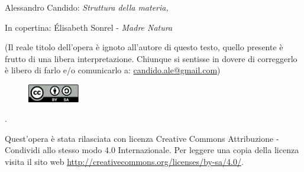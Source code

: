 \cleardoublepage


\begin{titlepage}
	\makeatletter
	\centering
	\vspace*{1.5cm}
	{\huge\bfseries \@title \par}
	\vspace{2cm}
	{\Large\itshape \@author \par}
	\makeatother
	
	\vfill
\end{titlepage}


\thispagestyle{empty}

\hfill

\vfill


\noindent Alessandro Candido: \textit{Struttura della materia,}
\textcopyleft\ \DTMMonthname{\the\month} \the\year
\newline

\noindent In copertina: \'Elisabeth Sonrel - \textit{Madre Natura}

(Il reale titolo dell'opera è ignoto all'autore di questo testo, quello presente è frutto di una libera interpretazione. Chiunque si sentisse in dovere di correggerlo è libero di farlo e/o comunicarlo a: \href{mailto:candido.ale@gmail.com}{candido.ale@gmail.com})

\begin{figure}
	\centering
	\includegraphics[width=0.2\textwidth]{Licenza/by-sa.pdf}
\end{figure}
.
\newline

Quest'opera è stata rilasciata con licenza Creative Commons Attribuzione - Condividi allo stesso modo 4.0 Internazionale. Per leggere una copia della licenza visita il sito web \href{http://creativecommons.org/licenses/by-sa/4.0/}{http://creativecommons.org/licenses/by-sa/4.0/}.


\clearpage
{}
\thispagestyle{empty}

